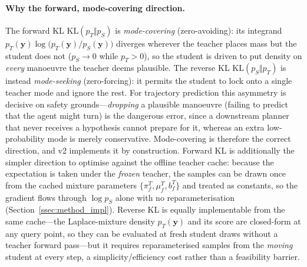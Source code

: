 \paragraph{Why the forward, mode-covering direction.} The forward KL
$\mathrm{KL}(p_T\Vert p_S)$ is \emph{mode-covering} (zero-avoiding): its integrand
$p_T(\mathbf{y})\log\!\big(p_T(\mathbf{y})/p_S(\mathbf{y})\big)$ diverges wherever
the teacher places mass but the student does not ($p_S\!\to\!0$ while $p_T\!>\!0$),
so the student is driven to put density on \emph{every} manoeuvre the teacher deems
plausible. The reverse KL $\mathrm{KL}(p_S\Vert p_T)$ is instead
\emph{mode-seeking} (zero-forcing): it permits the student to lock onto a single
teacher mode and ignore the rest. For trajectory prediction this asymmetry is
decisive on safety grounds---\emph{dropping} a plausible manoeuvre (failing to
predict that the agent might turn) is the dangerous error, since a downstream
planner that never receives a hypothesis cannot prepare for it, whereas an extra
low-probability mode is merely conservative. Mode-covering is therefore the correct
direction, and v2 implements it by construction. Forward KL is additionally the
simpler direction to optimise against the offline teacher cache: because the
expectation is taken under the \emph{frozen} teacher, the samples can be drawn
once from the cached mixture parameters $\{\pi^T_f,\mu^T_f,b^T_f\}$ and treated as
constants, so the gradient flows through $\log p_S$ alone with no reparameterisation
(Section~\ref{ssec:method_impl}). Reverse KL is equally implementable from the same
cache---the Laplace-mixture density $p_T(\mathbf{y})$ and its score are closed-form
at any query point, so they can be evaluated at fresh student draws without a teacher
forward pass---but it requires reparameterised samples from the \emph{moving} student
at every step, a simplicity/efficiency cost rather than a feasibility barrier.

